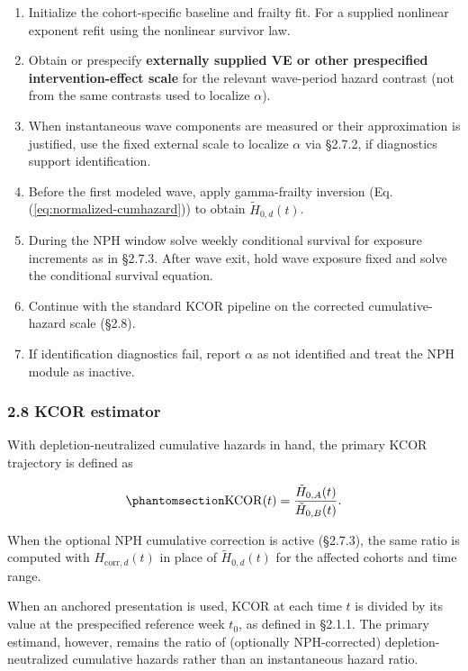\documentclass[
]{article}
\providecommand{\tightlist}{%
  \setlength{\itemsep}{0pt}\setlength{\parskip}{0pt}}
\begin{document}
\begin{enumerate}
\def\labelenumi{\arabic{enumi}.}
\tightlist
\item
  Initialize the cohort-specific baseline and frailty fit. For a supplied nonlinear exponent refit using the nonlinear survivor law.
\item
  Obtain or prespecify \textbf{externally supplied VE or other prespecified intervention-effect scale} for the relevant wave-period hazard contrast (not from the same contrasts used to localize \(\alpha\)).
\item
  When instantaneous wave components are measured or their approximation is justified, use the fixed external scale to localize \(\alpha\) via §2.7.2, if diagnostics support identification.
\item
  Before the first modeled wave, apply gamma-frailty inversion (Eq. (\ref{eq:normalized-cumhazard})) to obtain \(\tilde H_{0,d}(t)\).
\item
  During the NPH window solve weekly conditional survival for exposure increments as in §2.7.3. After wave exit, hold wave exposure fixed and solve the conditional survival equation.
\item
  Continue with the standard KCOR pipeline on the corrected cumulative-hazard scale (§2.8).
\item
  If identification diagnostics fail, report \(\alpha\) as not identified and treat the NPH module as inactive.
\end{enumerate}

\subsubsection{2.8 KCOR estimator}\label{kcor-estimator}

With depletion-neutralized cumulative hazards in hand, the primary KCOR trajectory is defined as

\begin{equation}\protect\phantomsection\label{eq:kcor-estimator}{\mathrm{KCOR}(t) = \frac{\tilde H_{0,A}(t)}{\tilde H_{0,B}(t)}.}\end{equation}

When the optional NPH cumulative correction is active (§2.7.3), the same ratio is computed with \(H_{\mathrm{corr},d}(t)\) in place of \(\tilde H_{0,d}(t)\) for the affected cohorts and time range.

When an anchored presentation is used, KCOR at each time \(t\) is divided by its value at the prespecified reference week \(t_0\), as defined in §2.1.1. The primary estimand, however, remains the ratio of (optionally NPH-corrected) depletion-neutralized cumulative hazards rather than an instantaneous hazard ratio.
\end{document}
